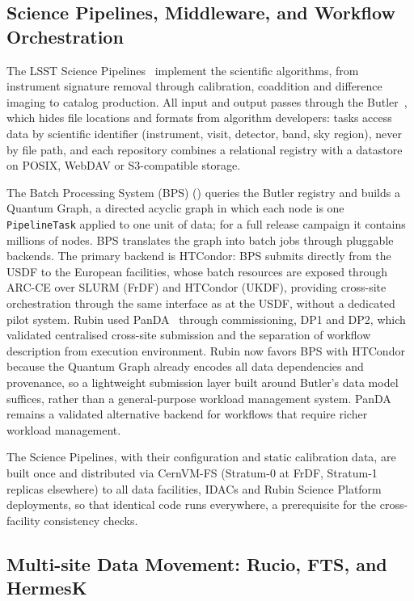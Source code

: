 \subsection{Science Pipelines, Middleware, and Workflow Orchestration}
\label{sec:pipelines}
%
The LSST Science Pipelines~\cite{PSTN-019} implement the scientific algorithms, from instrument signature removal through calibration, coaddition and difference imaging to catalog production.
All input and output passes through the Butler~\cite{2022SPIE12189E..11J}, which hides file locations and formats from algorithm developers: tasks access data by scientific identifier (instrument, visit, detector, band, sky region), never by file path, and each repository combines
a relational registry with a datastore on POSIX, WebDAV or S3-compatible storage.

The Batch Processing System (BPS) (\cite{2025ASPC..538..325G}) queries the Butler registry and builds a Quantum Graph, a directed acyclic graph in which each node is one \texttt{PipelineTask} applied to one unit of data; for a full release campaign it contains millions of nodes.
BPS translates the graph into batch jobs through pluggable backends.
The primary backend is HTCondor: BPS submits directly from the USDF to the European facilities, whose batch resources are exposed through ARC-CE over SLURM (FrDF) and HTCondor (UKDF), providing cross-site orchestration through the same interface as at the USDF, without a dedicated pilot system.
Rubin used PanDA~\cite{2024EPJWC.29504026K} through commissioning, DP1 and DP2, which validated centralised cross-site submission and the separation of workflow description from execution environment.
Rubin now favors BPS with HTCondor because the Quantum Graph already encodes all data dependencies and provenance, so a lightweight submission layer built around Butler's data model suffices, rather than a general-purpose workload management system.
PanDA remains a validated alternative backend for workflows that require richer workload management.

The Science Pipelines, with their configuration and static calibration data, are built once and distributed via CernVM-FS (Stratum-0 at FrDF, Stratum-1 replicas elsewhere) to all data facilities, IDACs and Rubin Science Platform deployments, so that identical code runs everywhere, a prerequisite for the cross-facility consistency checks.

\subsection{Multi-site Data Movement: Rucio, FTS, and HermesK}
\label{sec:rucio}

